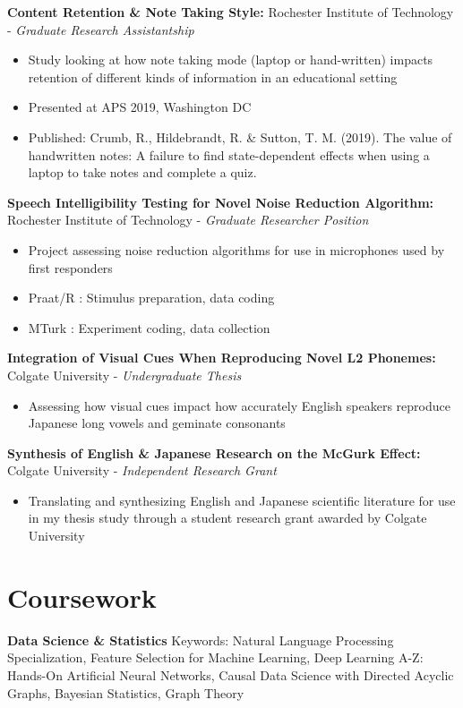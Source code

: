 \documentclass[a4paper,9pt]{extarticle}
\begin{document}
\noindent
\textbf{Content Retention \& Note Taking Style:}
Rochester Institute of Technology - \textit{Graduate Research Assistantship}
\begin{itemize}
\item Study looking at how note taking mode (laptop or hand-written) impacts retention of different kinds of information in an educational setting
\item Presented at APS 2019, Washington DC
\item Published: Crumb, R., Hildebrandt, R. \& Sutton, T. M. (2019). The value of handwritten notes: A failure to find state-dependent effects when using a laptop to take notes and complete a quiz.
\end{itemize}

\noindent
\textbf{Speech Intelligibility Testing for Novel Noise Reduction Algorithm:}
Rochester Institute of Technology - \textit{Graduate Researcher Position}
\begin{itemize}
\item Project assessing noise reduction algorithms for use in microphones used by first responders
\item Praat/R : Stimulus preparation, data coding
\item MTurk : Experiment coding, data collection
\end{itemize}

\noindent
\textbf{Integration of Visual Cues When Reproducing Novel L2 Phonemes:}
Colgate University - \textit{Undergraduate Thesis}
\begin{itemize}
\item Assessing how visual cues impact how accurately English speakers reproduce Japanese long vowels and geminate consonants
\end{itemize}

\noindent
\textbf{Synthesis of English \& Japanese Research on the McGurk Effect:}
Colgate University - \textit{Independent Research Grant}
\begin{itemize}
\item Translating and synthesizing English and Japanese scientific literature for use in my thesis study through a student research grant awarded by Colgate University
\end{itemize}

\section*{Coursework}

\noindent
\textbf{Data Science \& Statistics}
Keywords: Natural Language Processing Specialization, Feature Selection for Machine Learning, Deep Learning A-Z: Hands-On Artificial Neural Networks, Causal Data Science with Directed Acyclic Graphs, Bayesian Statistics, Graph Theory
\end{document}
